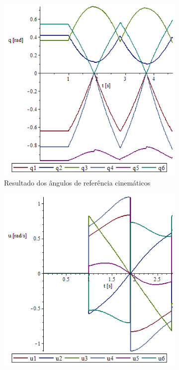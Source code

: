 \begin{figure}[h]
    \centering
    \begin{subfigure}[b]{0.40\textwidth}
        \includegraphics[width=\textwidth]{figs/qxt_exemplo}
        \caption{Resultado dos ângulos de referência cinemáticos}
        \label{fig::qxt_exemplo}
    \end{subfigure}
    \quad %
    \begin{subfigure}[b]{0.4\textwidth}
        \includegraphics[width=\textwidth]{figs/uxt_exemplo}

\end{subfigure}
\end{figure}
